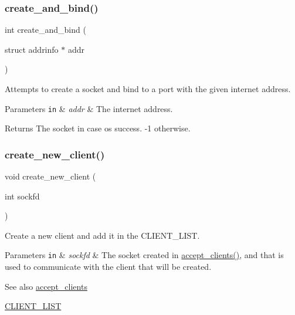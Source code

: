 \subsubsection{\texorpdfstring{create\+\_\+and\+\_\+bind()}{create\_and\_bind()}}
{\footnotesize\ttfamily int create\+\_\+and\+\_\+bind (\begin{DoxyParamCaption}\item[{struct addrinfo $\ast$}]{addr }\end{DoxyParamCaption})}



Attempts to create a socket and bind to a port with the given internet address. 


\begin{DoxyParams}[1]{Parameters}
\mbox{\tt in}  & {\em addr} & The internet address.\\
\hline
\end{DoxyParams}
\begin{DoxyReturn}{Returns}
The socket in case os success. -\/1 otherwise. 
\end{DoxyReturn}
\mbox{\label{zip-zop-server_8c_ab9a14cd690eac9781dd224e034fbd01d}} 
\subsubsection{\texorpdfstring{create\+\_\+new\+\_\+client()}{create\_new\_client()}}
{\footnotesize\ttfamily void create\+\_\+new\+\_\+client (\begin{DoxyParamCaption}\item[{int}]{sockfd }\end{DoxyParamCaption})}



Create a new client and add it in the {\ttfamily C\+L\+I\+E\+N\+T\+\_\+\+L\+I\+ST}. 


\begin{DoxyParams}[1]{Parameters}
\mbox{\tt in}  & {\em sockfd} & The socket created in \hyperlink{zip-zop-server_8c_acd1dc66d1afd8edcd165dc3f6855d355}{accept\+\_\+clients()}, and that is used to communicate with the client that will be created.\\
\hline
\end{DoxyParams}
\begin{DoxySeeAlso}{See also}
\hyperlink{zip-zop-server_8c_acd1dc66d1afd8edcd165dc3f6855d355}{accept\+\_\+clients} 

\hyperlink{zip-zop-server_8c_a32076dcdfaf1057a014d74d01cc7e08e}{C\+L\+I\+E\+N\+T\+\_\+\+L\+I\+ST} 
\end{DoxySeeAlso}
\mbox{\label{zip-zop-server_8c_a2d9748875d07382b9dbecb97c6cd9b62}} 
